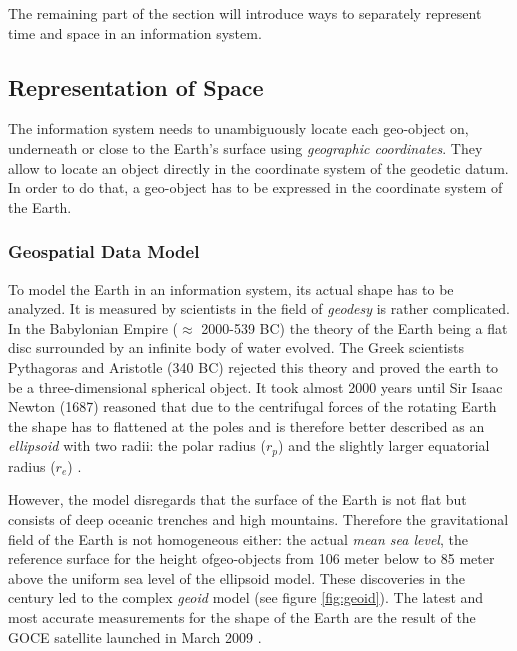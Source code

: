 
The remaining part of the section will introduce ways to separately represent time and space in an information system.



\subsection{Representation of Space} %
\label{sub:representation_of_space}

The information system needs to unambiguously locate each geo-object on, underneath or close to the Earth's surface using \emph{geographic coordinates}. They allow to locate an object directly in the coordinate system of the geodetic datum. In order to do that, a geo-object has to be expressed in the coordinate system of the Earth.

\subsubsection{Geospatial Data Model} %
\label{ssub:geospatial_data_model}

To model the Earth in an information system, its actual shape has to be analyzed. It is measured by scientists in the field of \emph{geodesy} is rather complicated. In the Babylonian Empire ($\approx$ 2000-539 BC) the theory of the Earth being a flat disc surrounded by an infinite body of water
evolved. The Greek scientists Pythagoras and Aristotle (340 BC) rejected this theory and proved the earth to be a three-dimensional spherical object. It took almost 2000 years until Sir Isaac Newton (1687) reasoned that due to the centrifugal forces of the rotating Earth the shape has to flattened at the poles and is therefore better described as an \emph{ellipsoid} with two radii: the polar radius ($r_p$) and the slightly larger equatorial radius ($r_e$)
\cite[pp. 69-77]{bolstad2008gis}.

However, the model disregards that the surface of the Earth is not flat but consists of deep oceanic trenches and high mountains. Therefore the gravitational field of the Earth is not homogeneous either: the actual \emph{mean sea level}, the reference surface for the height ofgeo-objects from 106 meter below to 85 meter above the uniform sea level of the ellipsoid model. These discoveries in the  century led to the complex \emph{geoid} model (see figure \ref{fig:geoid}). The latest and most accurate measurements for the shape of the Earth are the result of the GOCE satellite launched in March 2009
\cite{geoid, geoidESRI}.


